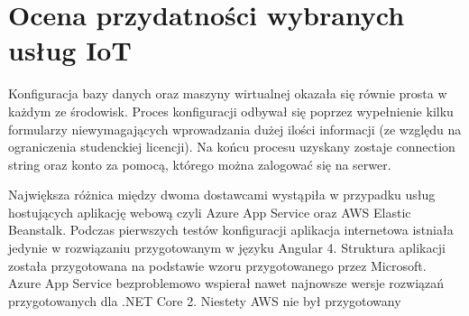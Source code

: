 \section{Ocena przydatności wybranych usług IoT}



Konfiguracja bazy danych oraz maszyny wirtualnej okazała się równie prosta w każdym ze środowisk. Proces konfiguracji odbywał się poprzez wypełnienie kilku formularzy niewymagających wprowadzania dużej ilości informacji (ze względu na ograniczenia studenckiej licencji). Na końcu procesu uzyskany zostaje connection string oraz konto za pomocą, którego można zalogować się na serwer.

Największa różnica między dwoma dostawcami wystąpiła w przypadku usług hostujących aplikację webową czyli Azure App Service oraz AWS Elastic Beanstalk. Podczas pierwszych testów konfiguracji aplikacja internetowa istniała jedynie w rozwiązaniu przygotowanym w języku Angular 4. Struktura aplikacji została przygotowana na podstawie wzoru przygotowanego przez Microsoft. Azure App Service bezproblemowo wspierał nawet najnowsze wersje rozwiązań przygotowanych dla .NET Core 2. Niestety AWS nie był przygotowany 